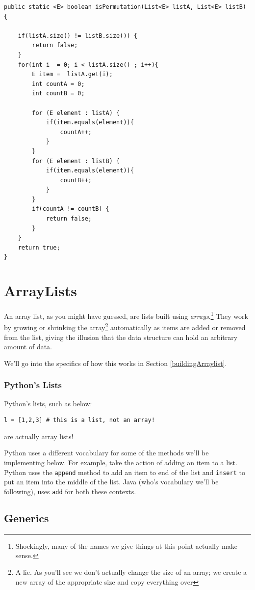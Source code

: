 \documentclass[10pt,a4paper]{book}
\begin{document}
\begin{verbatim}
public static <E> boolean isPermutation(List<E> listA, List<E> listB) {
	
	if(listA.size() != listB.size()) {
		return false;
	}
	for(int i  = 0; i < listA.size() ; i++){
		E item =  listA.get(i);
		int countA = 0;
		int countB = 0;
		
		for (E element : listA) {
			if(item.equals(element)){
				countA++;
			}
		}
		for (E element : listB) {
			if(item.equals(element)){
				countB++;
			}
		}
		if(countA != countB) {
			return false;
		}
	}
	return true;
}
\end{verbatim}



\section{ArrayLists}
An array list, as you might have guessed, are lists built using \textit{arrays}.\footnote{Shockingly, many of the names we give things at this point actually make sense.}
They work by growing or shrinking the array\footnote{A lie.  As you'll see we don't actually change the size of an array;  we create a new array of the appropriate size and copy everything over} automatically as items are added or removed from the list, giving the illusion that the data structure can hold an arbitrary amount of data.

We'll go into the specifics of how this works in Section \ref{buildingArraylist}.


\subsubsection{Python's Lists}
Python's lists, such as below:
\begin{verbatim}
l = [1,2,3] # this is a list, not an array!	
\end{verbatim}
are actually array lists! %

Python uses a different vocabulary for some of the methods we'll be implementing below.  
For example, take the action of adding an item to a list.
Python uses the \texttt{append} method to add an item to end of the list and \texttt{insert} to put an item into the middle of the list.
Java (who's vocabulary we'll be following), uses \texttt{add} for both these contexts. 



\subsection{Generics}
\end{document}
